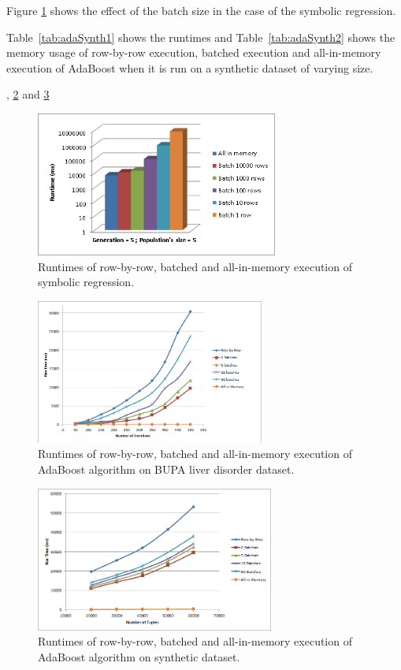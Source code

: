 Figure \ref{fig:gp-batch-histo} shows the effect of the batch size in the case of the symbolic regression.


Table~\ref{tab:adaSynth1} shows the runtimes and Table~\ref{tab:adaSynth2} shows the memory usage of row-by-row execution, batched execution and all-in-memory execution of AdaBoost when it is run on a synthetic dataset of varying size. 

, \ref{fig:adabatch1} and \ref{fig:adabatch2} 

\begin{figure}[ht]
\centering
\includegraphics[height=180px]{gp-batch-histo.png}
\caption{Runtimes of row-by-row, batched and all-in-memory execution of symbolic regression.}
\label{fig:gp-batch-histo}
\end{figure}

\begin{figure}[ht]
\centering
\includegraphics[height=180px]{ada2.png}
\caption{Runtimes of row-by-row, batched and all-in-memory execution of AdaBoost algorithm on BUPA liver disorder dataset.}
\label{fig:adabatch1}
\end{figure}

\begin{figure}[ht]
\centering
\includegraphics[height=180px]{ada3.png}
\caption{Runtimes of row-by-row, batched and all-in-memory execution of AdaBoost algorithm on synthetic dataset.}
\label{fig:adabatch2}
\end{figure}

